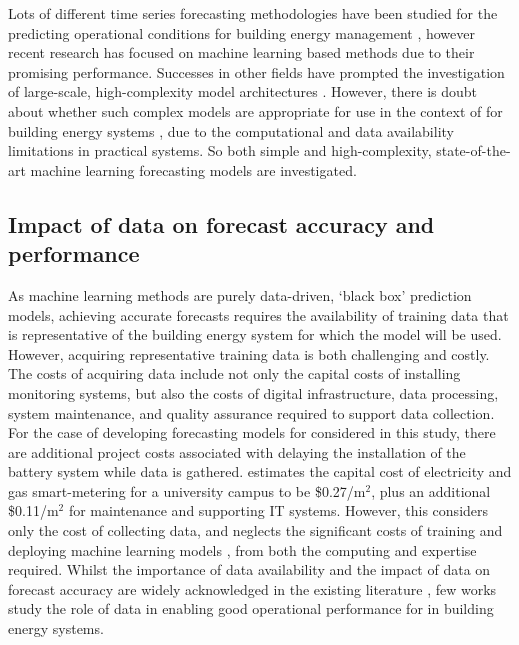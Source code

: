 Lots of different time series forecasting methodologies have been studied for the predicting operational conditions for building energy management \citep{sun2020ReviewThestateoftheartDatadriven}, however recent research has focused on machine learning based methods \citep{zhang2021ReviewMachineLearning,chou2018ForecastingEnergyConsumption,dai2023ComparisonDifferentDeep,rahman2018PredictingElectricityConsumption,fan2019AssessmentDeepRecurrent} due to their promising performance. Successes in other fields have prompted the investigation of large-scale, high-complexity model architectures \citep{choi2023PerformanceEvaluationDeep,dai2023CityTFTTemporalFusion}. However, there is doubt about whether such complex models are appropriate for use in the context of  for building energy systems \citep{zeng2023AreTransformersEffective,bunning2022PhysicsinformedLinearRegression,bunning2021ComparingMachineLearning}, due to the computational and data availability limitations in practical systems. So both simple and high-complexity, state-of-the-art machine learning forecasting models are investigated.


\subsection{Impact of data on forecast accuracy and  performance}

As machine learning methods are purely data-driven, `black box' prediction models, achieving accurate forecasts requires the availability of training data that is representative of the building energy system for which the model will be used. However, acquiring representative training data is both challenging and costly.
The costs of acquiring data include not only the capital costs of installing monitoring systems, but also the costs of digital infrastructure, data processing, system maintenance, and quality assurance required to support data collection. For the case of developing forecasting models for  considered in this study, there are additional project costs associated with delaying the installation of the battery system while data is gathered. \citep{motegi2003CaseStudiesEnergy} estimates the capital cost of electricity and gas smart-metering for a university campus to be \$0.27/m$^2$, plus an additional \$0.11/m$^2$ for maintenance and supporting IT systems. However, this considers only the cost of collecting data, and neglects the significant costs of training and deploying machine learning models \citep{strubell2020EnergyPolicyConsiderations}, from both the computing and expertise required.
Whilst the importance of data availability and the impact of data on forecast accuracy are widely acknowledged in the existing literature \citep{kathirgamanathan2021DatadrivenPredictiveControl,lee2020ModelPredictiveControl,wang2022ScienceMappingApproach,choi2023PerformanceEvaluationDeep,zhan2021DataRequirementsPerformance}, few works study the role of data in enabling good operational performance for  in building energy systems.

